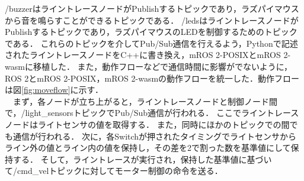 /buzzerはライントレースノードがPublishするトピックであり，ラズパイマウスから音を鳴らすことができるトピックである．
/ledsはライントレースノードがPublishするトピックであり，ラズパイマウスのLEDを制御するためのトピックである．
これらのトピックを介してPub/Sub通信を行えるよう，Pythonで記述されたライントレースノードをC++に書き換え，mROS 2-POSIXとmROS 2-wasmに移植した．
また，動作フローなどで通信時間に影響がでないように，ROS 2とmROS 2-POSIX，mROS 2-wasmの動作フローを統一した．動作フローは図\ref{fig:moveflow}に示す．
\\　まず，各ノードが立ち上がると，ライントレースノードと制御ノード間で，/light\_sensorsトピックでPub/Sub通信が行われる．
ここでライントレースノードはライトセンサの値を取得する．
また，同時にほかのトピックでの間でも通信が行われる．
次に，各Switchが押されたタイミングでライトセンサからライン外の値とライン内の値を保持し，その差を2で割った数を基準値にして保持する．
そして，ライントレースが実行され，保持した基準値に基づいて/cmd\_velトピックに対してモーター制御の命令を送る．

